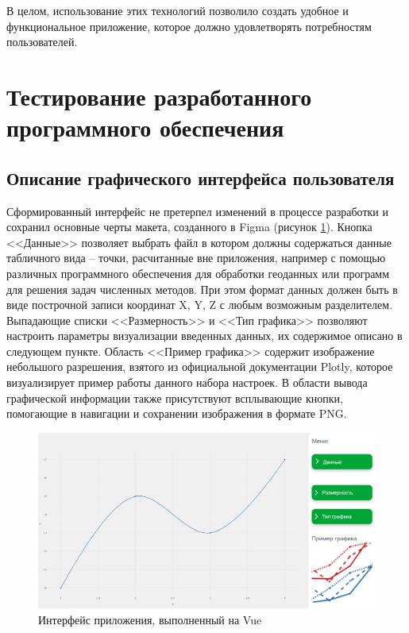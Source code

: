 В целом, использование этих технологий позволило создать удобное и функциональное приложение, которое должно удовлетворять потребностям пользователей.
\section{Тестирование разработанного программного обеспечения}
\subsection{Описание графического интерфейса пользователя}
Сформированный интерфейс не претерпел изменений в процессе разработки и сохранил основные черты макета, созданного в Figma (рисунок \ref{fig:12}). Кнопка <<Данные>> позволяет выбрать файл в котором должны содержаться данные табличного вида -- точки, расчитанные вне приложения, например с помощью различных программного обеспечения для обработки геоданных или программ для решения задач численных методов. При этом формат данных должен быть в виде построчной записи координат X, Y, Z с любым возможным разделителем. Выпадающие списки <<Размерность>> и <<Тип графика>> позволяют настроить параметры визуализации введенных данных, их содержимое описано в следующем пункте. Область <<Пример графика>> содержит изображение небольшого разрешения, взятого из официальной документации Plotly, которое визуализирует пример работы данного набора настроек. В области вывода графической информации также присутствуют всплывающие кнопки, помогающие в навигации и сохранении изображения в формате PNG.
\begin{figure}[h!]
    \center
    \includegraphics[scale=0.35]{fig/Interface.png}
    \caption{Интерфейс приложения, выполненный на Vue}
    \label{fig:12}
\end{figure}

